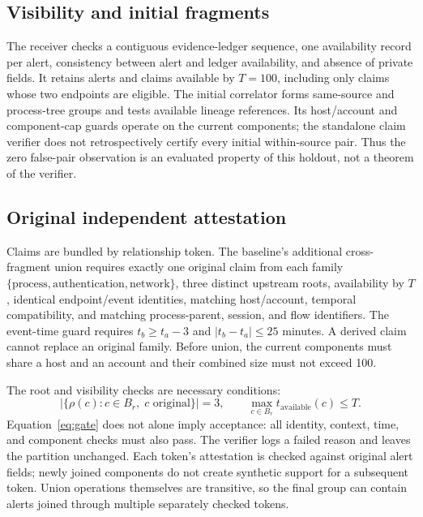 \subsection{Visibility and initial fragments}
The receiver checks a contiguous evidence-ledger sequence, one availability record per alert, consistency between alert and ledger availability, and absence of private fields. It retains alerts and claims available by $T=100$, including only claims whose two endpoints are eligible. The initial correlator forms same-source and process-tree groups and tests available lineage references. Its host/account and component-cap guards operate on the current components; the standalone claim verifier does not retrospectively certify every initial within-source pair. Thus the zero false-pair observation is an evaluated property of this holdout, not a theorem of the verifier.

\subsection{Original independent attestation}
Claims are bundled by relationship token. The baseline's additional cross-fragment union requires exactly one original claim from each family $\{\mathrm{process},\mathrm{authentication},\mathrm{network}\}$, three distinct upstream roots, availability by $T$, identical endpoint/event identities, matching host/account, temporal compatibility, and matching process-parent, session, and flow identifiers. The event-time guard requires $t_b\geq t_a-3$ and $|t_b-t_a|\leq25$ minutes. A derived claim cannot replace an original family. Before union, the current components must share a host and an account and their combined size must not exceed 100.

The root and visibility checks are necessary conditions:
\begin{equation}\label{eq:gate}
\left|\{\rho(c):c\in B_r,\;c\text{ original}\}\right|=3,\qquad
\max_{c\in B_r}t_{\mathrm{available}}(c)\leq T.
\end{equation}
Equation~\ref{eq:gate} does not alone imply acceptance: all identity, context, time, and component checks must also pass. The verifier logs a failed reason and leaves the partition unchanged. Each token's attestation is checked against original alert fields; newly joined components do not create synthetic support for a subsequent token. Union operations themselves are transitive, so the final group can contain alerts joined through multiple separately checked tokens.

